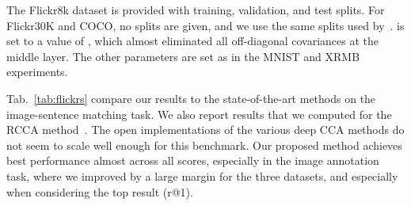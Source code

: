 \documentclass[10pt,twocolumn,letterpaper]{article}
\begin{document}
The Flickr8k dataset is provided with training, validation, and test splits. For Flickr30K and COCO, no splits are given, and we use the same splits used by~\cite{Klein_2015_CVPR}.  is set to a value of , which almost eliminated all off-diagonal covariances at the middle layer. The other parameters are set as in the MNIST and XRMB experiments.

Tab.~\ref{tab:flickrs} compare our results to the state-of-the-art methods on the image-sentence matching task. We also report results that we computed for the RCCA method~\cite{rcca}. The open implementations of the various deep CCA methods do not seem to scale well enough for this benchmark. Our proposed method achieves best performance almost across all scores, especially in the image annotation task, where we improved by a large margin for the three datasets, and especially when considering the top result (r@1).
\end{document}
